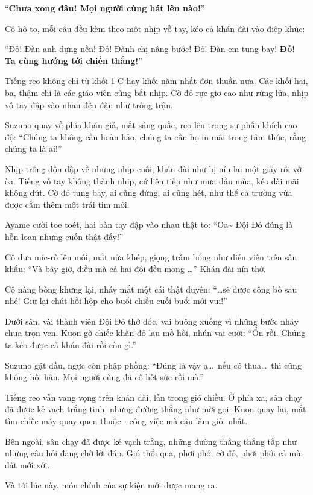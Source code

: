 \documentclass[../main.tex]{subfiles}
\begin{document}
``\textbf{Chưa xong đâu! Mọi người cùng hát lên nào!}''

Cô hô to, mỗi câu đều kèm theo một nhịp vỗ tay, kéo cả khán đài vào điệp khúc:

\tabs[6cm] ``Đỏ! Đàn anh dựng nền!
\tabs[6cm] Đỏ! Đành chị nâng bước!
\tabs[6cm] Đỏ! Đàn em tung bay!
\tabs[6cm] \textbf{Đỏ! Ta cùng hướng tới chiến thắng!}''

Tiếng reo không chỉ từ khối 1-C hay khối năm nhất đơn thuần nữa. Các khối hai, ba, thậm chí là các giáo viên cũng bắt nhịp. Cờ đỏ rực giơ cao như rừng lửa, nhịp vỗ tay đập vào nhau đều đặn như trống trận.

Suzuno quay về phía khán giả, mắt sáng quắc, reo lên trong sự phấn khích cao độ: ``Chúng ta không cần hoàn hảo, chúng ta cần họ in mãi trong tâm thức, rằng chúng ta là ai!''

Nhịp trống dồn dập về những nhịp cuối, khán đài như bị níu lại một giây rồi vỡ òa. Tiếng vỗ tay không thành nhịp, cứ liên tiếp như mưa đầu mùa, kéo dài mãi không dứt. Cờ đỏ tung bay, ai cũng đứng, ai cũng hét, như thể cả trường vừa được cắm thêm một trái tim mới.

Ayame cười toe toét, hai bàn tay đập vào nhau thật to: ``Oa\~{} Đội Đỏ đúng là hỗn loạn nhưng cuốn thật đấy!''

Cô đưa míc-rô lên môi, mắt nửa khép, giọng trầm bổng như diễn viên trên sân khấu: ``Và bây giờ, điều mà cả hai đội đều mong \dots'' Khán đài nín thở.

Cô nàng bỗng khựng lại, nháy mắt một cái thật duyên: ``\dots sẽ được công bố sau nhé! Giữ lại chút hồi hộp cho buổi chiều cuối buổi mới vui!''

Dưới sân, vài thành viên Đội Đỏ thở dốc, vai buông xuống vì những bước nhảy chưa trọn vẹn. Kuon gỡ chiếc khăn đỏ lau mồ hôi, nhún vai cười: ``Ổn rồi. Chúng ta kéo được cả khán đài rồi còn gì.''

Suzuno gật đầu, ngực còn phập phồng: ``Đúng là vậy ạ\dots\ nếu có thua\dots\ thì cũng không hối hận. Mọi người cũng đã cố hết sức rồi mà.''

Tiếng reo vẫn vang vọng trên khán đài, lẫn trong gió chiều. Ở phía xa, sân chạy đã được kẻ vạch trắng tinh, những đường thẳng như mời gọi. Kuon quay lại, mắt tìm chiếc máy quay quen thuộc - công việc mà cậu làm giỏi nhất.

Bên ngoài, sân chạy đã được kẻ vạch trắng, những đường thẳng thẳng tắp như những câu hỏi đang chờ lời đáp. Gió thổi qua, phơi phới cờ đỏ, phơi phới cả mùi đất mới xới.

Và tới lúc này, món chính của sự kiện mới được mang ra.
\end{document}
